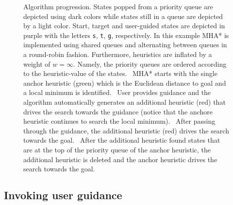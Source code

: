 \documentclass[conference]{IEEEtran}
\begin{document}
\begin{figure}[t]
{  }
  \caption{%
    Algorithm progression.
    States popped from a priority queue are depicted using dark colors while states still in a queue are depicted by a light color.
    Start, target and user-guided states are depicted in purple with the letters \texttt{s}, \texttt{t}, \texttt{g}, respectively. 
    In this example MHA* is implemented using shared queues and alternating between queues in a round-robin fashion. Furthermore, heuristics are inflated by a weight of $w=\infty$. Namely, the priority queues are ordered according to the heuristic-value of the states.
	~MHA* starts with the single anchor heuristic (green) which is the Euclidean distance to goal and a local minimum is identified.
	~User provides guidance and the algorithm automatically generates an additional heuristic (red) that drives the search towards the guidance (notice that the anchore heuristic continues to search the local minimum).
	~After passing through the guidance, the additional heuristic (red) drives the search towards the goal.
	~After the additional heuristic found states that are at the top of the priority queue of the anchor heuristic, the additional heuristic is deleted and the anchor heuristic drives the search towards the goal.
  }%
  \label{fig:filmstrip-dynamic_heuristic}%
  \vspace{-2.5mm}
\end{figure}


\subsection{Invoking user guidance}
\label{sec:q1}
\end{document}
